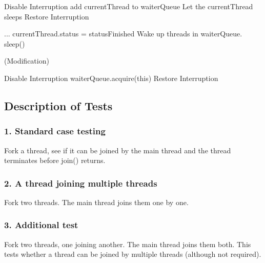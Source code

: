 \documentclass{article}
\begin{document}
	\begin{algorithm}[H]
		\begin{algorithmic}
   				\State Disable Interruption
					\State add currentThread to waiterQueue
					\State Let the currentThread sleeps
				\EndIf
				\State Restore Interruption
			\EndProcedure
		\end{algorithmic}
	\end{algorithm}
	
	\begin{algorithm}[H]
		\begin{algorithmic}
			\Procedure {finish()}{}
				\State ...
				\State currentThread.status = statusFinished
				\State Wake up threads in waiterQueue.
				\State sleep()
			\EndProcedure
		\end{algorithmic}
	\end{algorithm}
	
	(Modification)
	\begin{algorithm}[H]
		\begin{algorithmic}
			\Procedure {Init}{}
			\State Disable Interruption
			\State waiterQueue.acquire(this)
			\State Restore Interruption
			\EndProcedure
		\end{algorithmic}
	\end{algorithm}
	
	
	\subsection{Description of Tests}
	
	\subsubsection*{1. Standard case testing}
	Fork a thread, see if it can be joined by the main thread and the thread terminates before join() returns.
	
	\subsubsection*{2. A thread joining multiple threads}
	Fork two threads. The main thread joins them one by one.
	
	\subsubsection*{3. Additional test}
	Fork two threads, one joining another. The main thread joins them both. This tests whether a thread can be joined by multiple threads (although not required).
		
\end{document}
